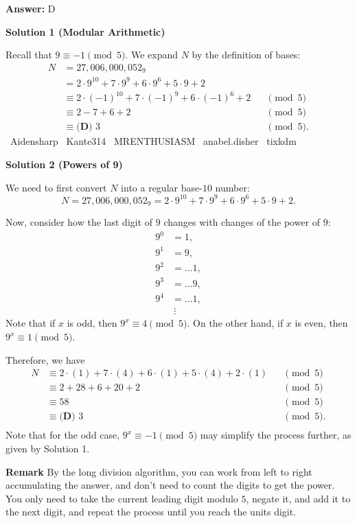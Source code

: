 \begin{enumerate}
 \textbf{Answer: }D



\textbf{Solution 1 (Modular Arithmetic)}

Recall that $9\equiv-1\pmod{5}.$ We expand $N$ by the definition of bases:
 \begin{align*} N&=27{,}006{,}000{,}052_9 \\ &= 2\cdot9^{10} + 7\cdot9^9 + 6\cdot9^6 + 5\cdot9 + 2 \\ &\equiv 2\cdot(-1)^{10} + 7\cdot(-1)^9 + 6\cdot(-1)^6 + 2 &&\pmod{5} \\ &\equiv 2-7+6+2 &&\pmod{5} \\ &\equiv \boxed{\textbf{(D) } 3} &&\pmod{5}. \end{align*}
~Aidensharp ~Kante314 ~MRENTHUSIASM ~anabel.disher ~tixkdm

 



\textbf{Solution 2 (Powers of 9)}

We need to first convert $N$ into a regular base-$10$ number: 
 \[N = 27{,}006{,}000{,}052_9 = 2\cdot9^{10} + 7\cdot9^9 + 6\cdot9^6 + 5\cdot9 + 2.\]

 Now, consider how the last digit of $9$ changes with changes of the power of $9:$
 \begin{align*} 9^0&=1, \\ 9^1&=9, \\ 9^2&=\ldots 1, \\ 9^3&=\ldots 9, \\ 9^4&=\ldots 1, \\ & \ \vdots \end{align*}
Note that if $x$ is odd, then $9^x \equiv 4\pmod{5}.$ On the other hand, if $x$ is even, then $9^x \equiv 1\pmod{5}.$

 Therefore, we have
 \begin{align*} N&\equiv 2\cdot(1) + 7\cdot(4) + 6\cdot(1) + 5\cdot(4) + 2\cdot(1) &&\pmod{5} \\ &\equiv 2+28+6+20+2 &&\pmod{5} \\ &\equiv 58 &&\pmod{5} \\ &\equiv \boxed{\textbf{(D) } 3} &&\pmod{5}. \\ \end{align*}
Note that for the odd case, $9^x \equiv -1\pmod{5}$ may simplify the process further, as given by Solution 1.

 \textbf{Remark} By the long division algorithm, you can work from left to right accumulating the answer, and don't need to count the digits to get the power. You only need to take the current leading digit modulo $5$, negate it, and add it to the next digit, and repeat the process until you reach the units digit.


\end{enumerate}
